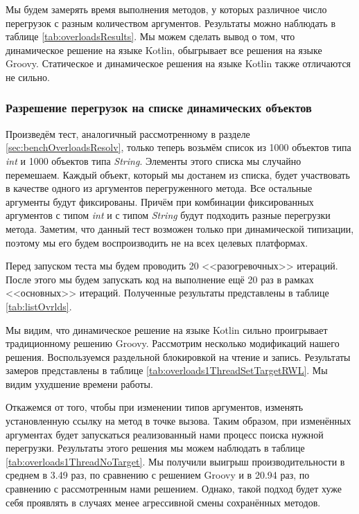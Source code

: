Мы будем замерять время выполнения методов, у которых различное число перегрузок с разным количеством аргументов. Результаты можно наблюдать в таблице  \ref{tab:overloadsResults}. Мы можем сделать вывод о том, что динамическое решение на языке Kotlin, обыгрывает все решения на языке Groovy. Статическое и динамическое решения на языке Kotlin также отличаются не сильно.

\subsubsection{Разрешение перегрузок на списке динамических объектов}
\label{sec:listDynObjects}

Произведём тест, аналогичный рассмотренному в разделе \ref{sec:benchOverloadsResolv}, только теперь возьмём список из 1000 объектов типа \textit{int} и 1000 объектов типа \textit{String}. Элементы этого списка мы случайно перемешаем. Каждый объект, который мы достанем из списка, будет участвовать в качестве одного из аргументов перегруженного метода. Все остальные аргументы будут фиксированы. Причём при комбинации фиксированных аргументов с типом \textit{int} и с типом \textit{String} будут подходить разные перегрузки метода. Заметим, что данный тест возможен только при динамической типизации, поэтому мы его будем воспроизводить не на всех целевых платформах.

Перед запуском теста мы будем проводить 20 <<разогревочных>> итераций. После этого мы будем запускать код на выполнение ещё 20 раз в рамках <<основных>> итераций. Полученные результаты представлены в таблице \ref{tab:listOvrlds}.

Мы видим, что динамическое решение на языке Kotlin сильно проигрывает традиционному решению Groovy. Рассмотрим несколько модификаций нашего решения. Воспользуемся раздельной блокировкой на чтение и запись\footnotemark. Результаты замеров представлены в таблице \ref{tab:overloads1ThreadSetTargetRWL}. Мы видим ухудшение времени работы.



Откажемся от того, чтобы при изменении типов аргументов, изменять установленную ссылку на метод в точке вызова. Таким образом, при изменённых аргументах будет запускаться реализованный нами процесс поиска нужной перегрузки.
Результаты этого решения мы можем наблюдать в таблице  \ref{tab:overloads1ThreadNoTarget}. Мы получили выигрыш производительности в среднем в 3.49 раз, по сравнению с решением Groovy и в 20.94 раз, по сравнению с рассмотренным нами решением. Однако, такой подход будет хуже себя проявлять в случаях менее агрессивной смены сохранённых методов.

